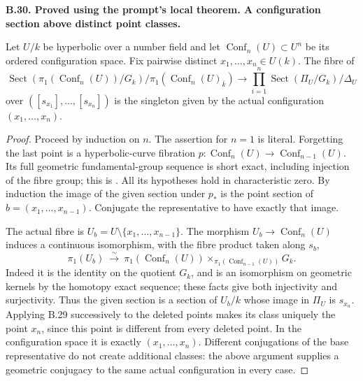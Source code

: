 \documentclass[11pt,oneside]{article}
\makeatletter
\newcounter{statementanchor}
\newenvironment{statement}[3]{%
 \refstepcounter{statementanchor}\def\@currentlabel{#1}%
 \par\addvspace{9pt}\noindent
 \textbf{#1. #2. #3.}\par\nobreak\noindent\ignorespaces
}{\par\addvspace{5pt}}
\makeatother
\begin{document}
\begin{statement}{B.30}{Proved using the prompt's local theorem}{A configuration section above distinct point classes}
\label{st:B.30}

Let $U/k$ be hyperbolic over a number field and let
$\operatorname{Conf}_n(U)\subset U^n$ be its ordered configuration
space.  Fix pairwise distinct $x_1,\ldots,x_n\in U(k)$.
The fibre of
\[
 \operatorname{Sect}(\pi_1(\operatorname{Conf}_n(U))/G_k)
       /\pi_1(\operatorname{Conf}_n(U)_{\bar k})
 \longrightarrow
 \prod_{i=1}^n\operatorname{Sect}(\Pi_U/G_k)/\Delta_U
\]
over $([s_{x_1}],\ldots,[s_{x_n}])$ is the singleton given by the
actual configuration $(x_1,\ldots,x_n)$.
\end{statement}
\begin{proof}
Proceed by induction on $n$.  The assertion for $n=1$ is literal.
Forgetting the last point is a hyperbolic-curve fibration
$p:\operatorname{Conf}_n(U)\to\operatorname{Conf}_{n-1}(U)$.
Its full geometric fundamental-group sequence is short exact,
including injection of the fibre group; this is
\cite[Proposition 2.2(i), with the total formation]{B_MochizukiTamagawa}.
All its hypotheses hold in characteristic zero.
By induction the image of the given section under $p_*$ is the
point section of $b=(x_1,\ldots,x_{n-1})$.
Conjugate the representative to have exactly that image.

The actual fibre is $U_b=U\setminus\{x_1,\ldots,x_{n-1}\}$.
The morphism $U_b\to\operatorname{Conf}_n(U)$ induces a continuous
isomorphism, with the fibre product taken along $s_b$,
\[
 \pi_1(U_b)\ \xrightarrow{\sim}\
 \pi_1(\operatorname{Conf}_n(U))
       \times_{\pi_1(\operatorname{Conf}_{n-1}(U))}G_k.
\]
Indeed it is the identity on the quotient $G_k$, and is an
isomorphism on geometric kernels by the homotopy exact sequence;
these facts give both injectivity and surjectivity.
Thus the given section is a section of $U_b/k$ whose image in
$\Pi_U$ is $s_{x_n}$.  Applying B.29 successively to the deleted
points makes its class uniquely the point $x_n$, since this point
is different from every deleted point.  In the configuration space
it is exactly $(x_1,\ldots,x_n)$.
Different conjugations of the base representative do not create
additional classes: the above argument supplies a geometric
conjugacy to the same actual configuration in every case.
\end{proof}
\end{document}

